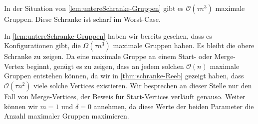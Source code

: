 \begin{satz}[name={\cite[Thm.~5]{buchin2015}},label=satz:obereSchranke-Gruppen]
	In der Situation von \cref{lem:untereSchranke-Gruppen} gibt es $\mathcal{O}(\tau n^3)$ maximale Gruppen.
	Diese Schranke ist scharf im Worst-Case.
\end{satz}
\begin{beweis}
	In \cref{lem:untereSchranke-Gruppen} haben wir bereits gesehen, dass es Konfigurationen gibt, die $\Omega(\tau n^3)$ maximale Gruppen haben.
	Es bleibt die obere Schranke zu zeigen.
	Da eine maximale Gruppe an einem Start- oder Merge-Vertex beginnt, genügt es zu zeigen, dass an jedem solchen $\mathcal{O}(n)$ maximale Gruppen entstehen können, da wir in \cref{thm:schranke-Reeb} gezeigt haben, dass $\mathcal{O}(\tau n^2)$ viele solche Vertices existieren.
	Wir besprechen an dieser Stelle nur den Fall von Merge-Vertices, der Beweis für Start-Vertices verläuft genauso.
	Weiter können wir $m=1$ und $\delta=0$ annehmen, da diese Werte der beiden Parameter die Anzahl maximaler Gruppen maximieren.
	

\end{beweis}
